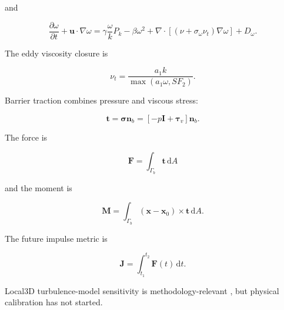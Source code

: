 and

\begin{equation}
\label{eq:sst-omega}
\frac{\partial \omega}{\partial t}
+
\mathbf u\cdot\nabla\omega
=
\gamma\frac{\omega}{k}P_k-\beta\omega^2
+
\nabla\cdot\left[(\nu+\sigma_\omega\nu_t)\nabla\omega\right]
+D_\omega .
\end{equation}

The eddy viscosity closure is

\begin{equation}
\label{eq:eddy-viscosity}
\nu_t=\frac{a_1k}{\max(a_1\omega,SF_2)} .
\end{equation}

Barrier traction combines pressure and viscous stress:

\begin{equation}
\label{eq:barrier-traction}
\mathbf t=
\boldsymbol\sigma\mathbf n_b
=
\left[-p\mathbf I+\boldsymbol\tau_v\right]\mathbf n_b .
\end{equation}

The force is

\begin{equation}
\label{eq:barrier-force}
\mathbf F
=
\int_{\Gamma_b}
\mathbf t\,\mathrm dA
\end{equation}

and the moment is

\begin{equation}
\label{eq:barrier-moment}
\mathbf M
=
\int_{\Gamma_b}
(\mathbf x-\mathbf x_0)
\times
\mathbf t
\,\mathrm dA .
\end{equation}

The future impulse metric is

\begin{equation}
\label{eq:future-impulse}
\mathbf J
=
\int_{t_1}^{t_2}
\mathbf F(t)\,\mathrm dt .
\end{equation}

Local3D turbulence-model sensitivity is methodology-relevant \autocite{kozelkov2022turbulence,watanabe2022validation}, but physical calibration has not started.
